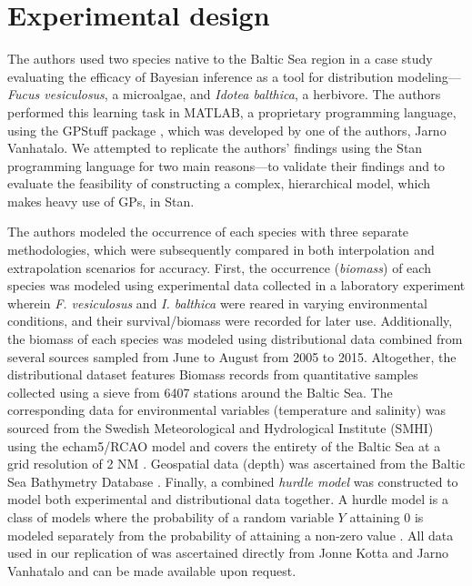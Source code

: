 \documentclass[
  12pt,
]{book}
\theoremstyle{definition}
\theoremstyle{definition}
\theoremstyle{definition}
\theoremstyle{remark}
\begin{document}
\hypertarget{experimental-design}{%
\section{Experimental design}\label{experimental-design}}

The authors used two species native to the Baltic Sea region in a case study evaluating the efficacy of Bayesian inference as a tool for distribution modeling---\emph{Fucus vesiculosus}, a microalgae, and \emph{Idotea balthica}, a herbivore.
The authors performed this learning task in MATLAB, a proprietary programming language, using the GPStuff package \citep{Vanhatalo2015}, which was developed by one of the authors, Jarno Vanhatalo.
We attempted to replicate the authors' findings using the Stan programming language for two main reasons---to validate their findings and to evaluate the feasibility of constructing a complex, hierarchical model, which makes heavy use of GPs, in Stan.

The authors modeled the occurrence of each species with three separate methodologies, which were subsequently compared in both interpolation and extrapolation scenarios for accuracy.
First, the occurrence (\emph{biomass}) of each species was modeled using experimental data collected in a laboratory experiment wherein \emph{F. vesiculosus} and \emph{I. balthica} were reared in varying environmental conditions, and their survival/biomass were recorded for later use.
Additionally, the biomass of each species was modeled using distributional data combined from several sources sampled from June to August from 2005 to 2015.
Altogether, the distributional dataset features Biomass records from quantitative samples collected using a sieve from 6407 stations around the Baltic Sea.
The corresponding data for environmental variables (temperature and salinity) was sourced from the Swedish Meteorological and Hydrological Institute (SMHI) using the echam5/RCAO model and covers the entirety of the Baltic Sea at a grid resolution of 2 NM \citep{Meier2012}.
Geospatial data (depth) was ascertained from the Baltic Sea Bathymetry Database \citep{Bath2021}.
Finally, a combined \emph{hurdle model} was constructed to model both experimental and distributional data together.
A hurdle model is a class of models where the probability of a random variable \(Y\) attaining 0 is modeled separately from the probability of attaining a non-zero value \citep[  5.6]{StanManual2016}.
All data used in our replication of \citet{Kotta2019} was ascertained directly from Jonne Kotta and Jarno Vanhatalo and can be made available upon request.

  
\end{document}
